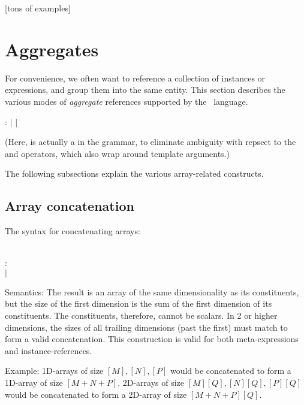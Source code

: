 [tons of examples]

\section{Aggregates}
\label{sec:arrays:aggregate}

For convenience, we often want to reference a collection of instances
or expressions, and group them into the same entity.  
This section describes the various modes of \emph{aggregate} references
supported by the \hac\ language.  

\medskip
\noindent
{}
: 
$|$ 
$|$ 
\medskip

(Here,  is actually a  in the grammar, 
to eliminate ambiguity with repsect to the \ttt{<} and \ttt{>} operators, 
which also wrap around template arguments.)

The following subsections explain the various array-related constructs.  

\subsection{Array concatenation}
\label{sec:arrays:aggregate:concatenation}

The syntax for concatenating arrays:

\medskip
\noindent
{}\\
:  \ttt{\#} \\
$|$ 
\medskip

Semantics: 
The result is an array of the same dimensionality as its constituents, 
but the size of the first dimension is the sum of the first dimension
of its constituents.  The constituents, therefore, cannot be scalars.  
In 2 or higher dimensions, the sizes of all trailing dimensions
(past the first) must match to form a valid concatenation.  
This construction is valid for both meta-expressions and instance-references.  

Example:
1D-arrays of size $[M], [N], [P]$ would be concatenated to form
a 1D-array of size $[M+N+P]$.
2D-arrays of size $[M][Q], [N][Q], [P][Q]$ would be concatenated to form
a 2D-array of size $[M+N+P][Q]$.

